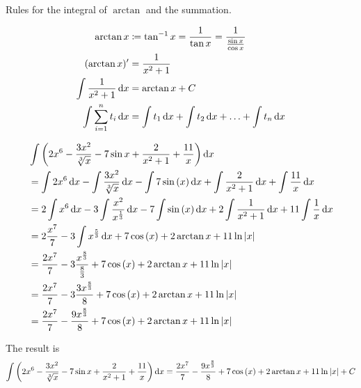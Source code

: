 Rules for the integral of $\arctan$ and the summation.

\begin{align*}
    \arctan{x} &\coloneq \tan^{-1}{x} = \frac{1}{\tan{x}} 
    = \frac{1}{\frac{\sin{x}}{\cos{x}}} \\
    (\arctan{x})' &= \frac{1}{x^{2} + 1} \\
    \int \frac{1}{x^{2} + 1} \mathop{}\!\mathrm{d}{x} &= \arctan{x} + C \\
    \int \sum_{i = 1}^{n} t_{i} \mathop{}\!\mathrm{d}{x} 
    &= \int t_{1} \mathop{}\!\mathrm{d}{x}
    + \int t_{2} \mathop{}\!\mathrm{d}{x}
    + \ldots 
    + \int t_{n} \mathop{}\!\mathrm{d}{x} \\
\end{align*}

\begin{align}
    &\int \left( 2x^{6} - \frac{3x^{2}}{\sqrt[3]{x}} 
    - 7\sin{x} + \frac{2}{x^{2} + 1} + \frac{11}{x} \right) \diff{x} \\
    &= \int 2x^{6} \diff{x} 
    - \int \frac{3x^{2}}{\sqrt[3]{x}} \diff{x}
    - \int 7\sin{(x)} \diff{x}
    + \int \frac{2}{x^{2} + 1} \diff{x}
    + \int \frac{11}{x} \diff{x} \\  
    &= 2\int x^{6} \diff{x} 
    - 3\int \frac{x^{2}}{x^{\frac{1}{3}}} \diff{x}
    - 7\int \sin{(x)} \diff{x}
    + 2\int \frac{1}{x^{2} + 1} \diff{x}
    + 11\int \frac{1}{x} \diff{x} \\
    &= 2 \frac{x^{7}}{7} 
    - 3\int x^{\frac{5}{3}} \diff{x}
    + 7\cos{(x)} 
    + 2\arctan{x}
    + 11\ln{|x|} \\
    &= \frac{2x^{7}}{7} 
    - 3\frac{x^{\frac{8}{3}}}{\frac{8}{3}}
    + 7\cos{(x)} 
    + 2\arctan{x}
    + 11\ln{|x|} \\
    &= \frac{2x^{7}}{7} 
    - 3\frac{3x^{\frac{8}{3}}}{8}
    + 7\cos{(x)} 
    + 2\arctan{x}
    + 11\ln{|x|} \\
    &= \frac{2x^{7}}{7} 
    - \frac{9x^{\frac{8}{3}}}{8}
    + 7\cos{(x)} 
    + 2\arctan{x}
    + 11\ln{|x|}
\end{align}

The result is
$$
    \int \left( 2x^{6} - \frac{3x^{2}}{\sqrt[3]{x}} 
    - 7\sin{x} + \frac{2}{x^{2} + 1} + \frac{11}{x} \right) \mathop{}\!\mathrm{d}{x}
    = \frac{2x^{7}}{7} 
    - \frac{9x^{\frac{8}{3}}}{8}
    + 7\cos{(x)} 
    + 2\arctan{x}
    + 11\ln{|x|} + C
$$

\pagebreak

